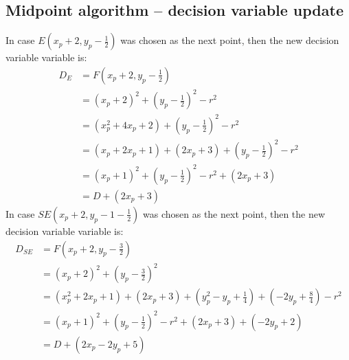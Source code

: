 \documentclass[a4paper]{article}
\begin{document}
\subsection{Midpoint algorithm -- decision variable update}
\label{app:decision_var_update}
In case $E(x_p+2, y_p-\frac{1}{2})$ was chosen as the next point, then the new decision variable variable is:
\begin{align*}
    D_E &= F(x_p + 2, y_p - \frac{1}{2}) \\
        &= (x_p+2)^2 + (y_p - \frac{1}{2})^2 - r^2 \\
        &= (x_p^2+4x_p+2) + (y_p-\frac{1}{2})^2 - r^2 \\
        &= (x_p +2x_p + 1) + (2x_p + 3) + (y_p-\frac{1}{2})^2 - r^2 \\
        &= (x_p+1)^2 + (y_p-\frac{1}{2})^2 -r^2 + (2x_p + 3) \\
        &= D + (2x_p+3)
\end{align*}
In case $SE(x_p+2, y_p-1-\frac{1}{2})$ was chosen as the next point, then the new decision variable variable is:
\begin{align*}
    D_{SE} &= F(x_p+2, y_p -\frac{3}{2}) \\
    &= (x_p+2)^2 + (y_p-\frac{3}{2})^2 \\
    &= (x_p^2 + 2x_p + 1) + (2x_p+3) + (y_p^2 -y_p + \frac{1}{4}) + (-2y_p+\frac{8}{4}) - r^2 \\
    &= (x_p+1)^2 + (y_p - \frac{1}{2})^2 - r^2 + (2x_p+3) + (-2y_p + 2) \\
    &= D + (2x_p -2y_p + 5)
\end{align*}
\end{document}
